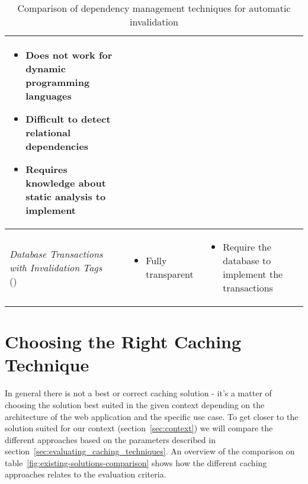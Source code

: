 \begin{table}[ht!]
\begin{tabular}{lll}
{{\begin{itemize}[leftmargin=0.75em]
          \item Does not work for dynamic programming languages
          \item Difficult to detect relational dependencies
          \item Requires knowledge about static analysis to implement
        \end{itemize}
      }
    } \\
    \hline
    {
      \parbox{3.5cm}{
        \emph{Database Transactions with Invalidation Tags} \\ (\cite{paper:liskov})
      }
    } & {
      \parbox{3.5cm}{
        \begin{itemize}[leftmargin=0.75em]
          \item Fully transparent
        \end{itemize}
      }
    } & {
      \parbox{3.5cm}{
        \begin{itemize}[leftmargin=0.75em]
          \item Require the database to implement the transactions
        \end{itemize}
      }
    } \\
    \hline
  \end{tabular}
  \caption{Comparison of dependency management techniques for automatic invalidation}
  \label{fig:dependency-management-comparison}
\end{table}



\section{Choosing the Right Caching Technique}
\label{sec:choosing_the_right_caching_technique}

In general there is not a best or correct caching solution - it's a matter of choosing the solution best suited in the given context depending on the architecture of the web application and the specific use case. To get closer to the solution suited for our context (section~\ref{sec:context}) we will compare the different approaches based on the parameters described in section~\ref{sec:evaluating_caching_techniques}. An overview of the comparison on table~\ref{fig:existing-solutions-comparison} shows how the different caching approaches relates to the evaluation criteria.

